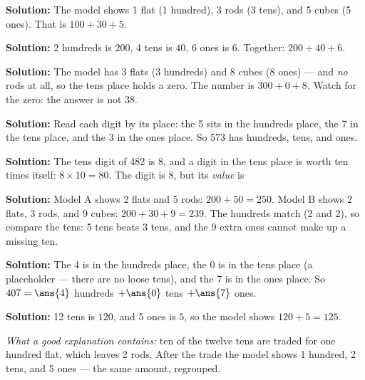 \documentclass[12pt]{article}
\begin{document}



\textbf{Solution:} The model shows 1 flat (1 hundred), 3 rods (3 tens), and
5 cubes (5 ones). That is $100 + 30 + 5$. 


\textbf{Solution:} 2 hundreds is $200$, 4 tens is $40$, 6 ones is $6$.
Together: $200 + 40 + 6$. 


\textbf{Solution:} The model has 3 flats (3 hundreds) and 8 cubes (8 ones)
--- and \emph{no} rods at all, so the tens place holds a zero. The number is
$300 + 0 + 8$. Watch for the zero: the answer is not 38. 


\textbf{Solution:} Read each digit by its place: the 5 sits in the hundreds
place, the 7 in the tens place, and the 3 in the ones place.
So 573 has  hundreds,  tens, and  ones.


\textbf{Solution:} The tens digit of 482 is 8, and a digit in the tens place
is worth ten times itself: $8 \times 10 = 80$. The digit is 8, but its
\emph{value} is 


\textbf{Solution:} Model A shows 2 flats and 5 rods: $200 + 50 = 250$.
Model B shows 2 flats, 3 rods, and 9 cubes: $200 + 30 + 9 = 239$. The
hundreds match (2 and 2), so compare the tens: 5 tens beats 3 tens, and the
9 extra ones cannot make up a missing ten. 


\textbf{Solution:} The 4 is in the hundreds place, the 0 is in the tens
place (a placeholder --- there are no loose tens), and the 7 is in the ones
place. So $407 = \ans{4}$ hundreds $+ \ans{0}$ tens $+ \ans{7}$ ones.


\textbf{Solution:} 12 tens is $120$, and 5 ones is $5$, so the model shows
$120 + 5 = 125$. 

\emph{What a good explanation contains:} ten of the twelve tens are traded
for one hundred flat, which leaves 2 rods. After the trade the model shows
1 hundred, 2 tens, and 5 ones --- the same amount, regrouped.
\end{document}
